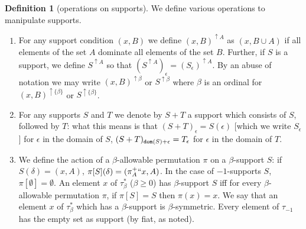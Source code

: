\documentclass[112pt]{article}
\theoremstyle{definition}
\newtheorem{definition}[theorem]{Definition}
\theoremstyle{remark}
\begin{document}
\begin{comment}

We make the formal requirement on supports
that if the range of a support contains $(x,A)$ and $(y,A)$ where $x,y$ are typed near-litters and either $(x \Delta y)\cap \tau_{-1}$ or $(x \cap y) \cap \tau_{-1}$ is small, that all $(z,A)$ with $z\cap \tau_{-1}$ a singleton subset of this small set are included in the range of the support.

For any supports $S$ and $T$ we denote by $S+T$ a support which consists
of $S$, followed by $T$, followed by the atoms which need to be added to make this a support (to make it satisfy the additional condition):  what this means is that $(S+T)_\epsilon = S(\epsilon)$ [which we write $S_\epsilon$] for $\epsilon$ in the domain of $S$, $(S+T)_{{\tt dom}(S)+\epsilon} = T_\epsilon$ for $\epsilon$ in the domain of $T$, and the rest of the range of $S+T$ consists of the support conditions with atomic first component  which must be added to satisfy the additional condition [this is not uniquely determined:  supports usually have many possible sums because the needed additional conditions can be added in any order.]
\end{comment}

\begin{definition}[operations on supports]\label{def:support_operations}
{We define various operations to manipulate supports.}
\begin{enumerate}
\item For any support condition $(x,B)$ we define $(x,B)^{\uparrow A}$ as $(x,B\cup A)$ if all elements of the set $A$ dominate all elements of the set $B$.
Further, if $S$ is a support, we define $S^{\uparrow A}$ so that $(S^{\uparrow A})_\epsilon = (S_\epsilon)^{\uparrow A}$.  By an abuse of notation we may write $(x,B)^{\uparrow \beta}$ or $S^{\uparrow \beta}$ where $\beta$ is an ordinal for $(x,B)^{\uparrow \{\beta\}}$ or $S^{\uparrow \{\beta\}}$.

\item For any supports $S$ and $T$ we denote by $S+T$ a support which consists
of $S$, followed by $T$:  what this means is that $(S+T)_\epsilon = S(\epsilon)$ [which we write $S_\epsilon$] for $\epsilon$ in the domain of $S$, $(S+T)_{{\tt dom}(S)+\epsilon} = T_\epsilon$ for $\epsilon$ in the domain of $T$.

\item We define the action of a $\beta$-allowable permutation $\pi$ on a $\beta$-support $S$:  if $S(\delta) = (x,A)$, $\pi[S](\delta) = (\pi^+_A``x,A)$.  In the case of $-1$-supports $S$, $\pi[\emptyset]=\emptyset$.
An element $x$ of $\tau^*_\beta$ ($\beta \geq 0$) has $\beta$-support $S$ iff for every $\beta$-allowable permutation $\pi$, if $\pi[S] = S$ then $\pi(x)=x$.  We say that  an element $x$ of $\tau^*_\beta$ which has a $\beta$-support is $\beta$-symmetric. Every element of $\tau_{-1}$ has the empty set as support (by fiat, as noted).
\end{enumerate}
\end{definition}
\end{document}
